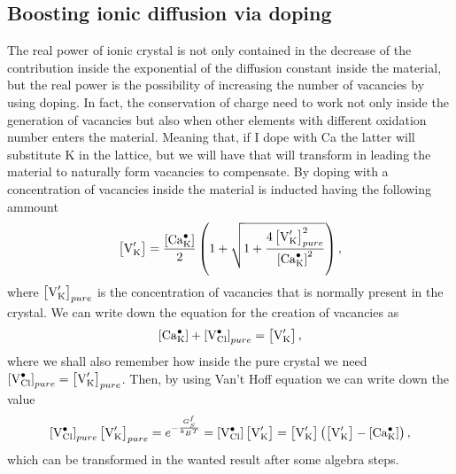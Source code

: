 \subsection{Boosting ionic diffusion via doping}

The real power of ionic crystal is not only contained in the decrease of the contribution inside the exponential of the diffusion constant inside the material, but the real power is the possibility of increasing the number of vacancies by using doping. In fact, the conservation of charge need to work not only inside the generation of vacancies but also when other elements with different oxidation number enters the material. Meaning that, if I dope  with Ca the latter will substitute K in the lattice, but we will have that  will transform in  leading the material to naturally form vacancies to compensate.
{
    By doping  with  a concentration of vacancies inside the material is inducted having the following ammount
    \begin{equation}
        \left[ \ce{V_K}^\prime \right] = \frac{\left[ \ce{Ca_K}^\bullet \right]}{2}\left( 1 + \sqrt{1 + \frac{4 \left[ \ce{V_K}^\prime \right]^2_{pure}}{\left[ \ce{Ca_K}^\bullet \right]^2}} \right),
    \end{equation}
    where $\left[ \ce{V_K}^\prime \right]_{pure}$ is the concentration of vacancies that is normally present in the crystal.
}
{
    We can write down the equation for the creation of vacancies as
    \begin{equation}
        \left[ \ce{Ca_K}^\bullet \right] + \left[ \ce{V_{Cl}}^\bullet \right]_{pure} = \left[ \ce{V_K}^\prime \right],
    \end{equation}
    where we shall also remember how inside the pure crystal we need $\left[ \ce{V_{Cl}}^\bullet \right]_{pure} = \left[ \ce{V_K}^\prime \right]_{pure}$. Then, by using Van't Hoff equation we can write down the value
    \begin{equation}
        \left[ \ce{V_{Cl}}^\bullet \right]_{pure} \left[ \ce{V_K}^\prime \right]_{pure} = e^{-\frac{G_S^f}{k_BT}} = \left[ \ce{V_{Cl}}^\bullet \right] \left[ \ce{V_K}^\prime \right] = \left[ \ce{V_K}^\prime \right]\left( \left[ \ce{V_K}^\prime \right] - \left[ \ce{Ca_K}^\bullet \right] \right),
    \end{equation}
    which can be transformed in the wanted result after some algebra steps.
}
\noindent
